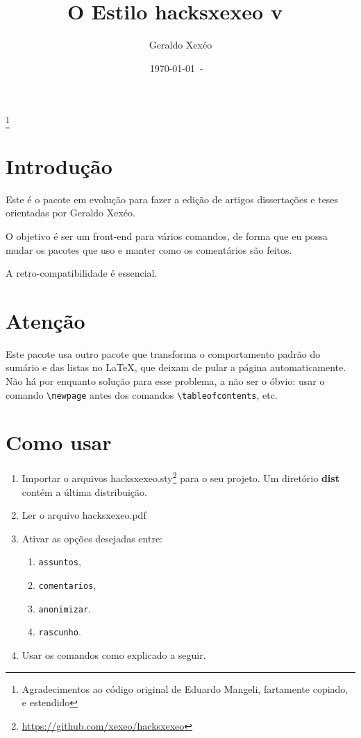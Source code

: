 \documentclass{article}
\title{O Estilo hacksxexeo v\ \hacksxexeoversion}
\author{Geraldo Xexéo}
\date{\today\ - \ \currenttime}
\begin{document}
\maketitle
\thanks{Agradecimentos ao código original de Eduardo Mangeli, fartamente copiado, e estendido}

\section{Introdução}

Este é o pacote em evolução para fazer a edição de artigos dissertações e teses orientadas por Geraldo Xexéo.

O objetivo é ser um front-end para vários comandos, de forma que eu possa mudar os pacotes que uso e manter como os comentários são feitos.

A retro-compatibilidade é essencial.

\section{Atenção}

Este pacote usa outro pacote que transforma o comportamento padrão do sumário e das listas no \LaTeX, que deixam de pular a página automaticamente. Não há por enquanto solução para esse problema, a não ser o óbvio: usar o comando \verb!\newpage! antes dos comandos \verb!\tableofcontents!, etc.

\section{Como usar}

\begin{enumerate}
    \item Importar o arquivos hacksxexeo.sty\footnote{\url{https://github.com/xexeo/hacksxexeo}} para o seu  projeto. Um diretório \textbf{dist} contém a última distribuição.
    \item Ler o arquivo hacksxexeo.pdf
    \item Ativar as opções desejadas entre:
    \begin{enumerate}
        \item \verb!assuntos!,
        \item \verb!comentarios!,
        \item \verb!anonimizar!.
        \item \verb!rascunho!.
    \end{enumerate}
    \item Usar os comandos como explicado a seguir.
\end{enumerate}
\end{document}
